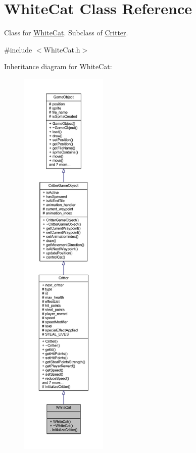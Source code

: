 \hypertarget{class_white_cat}{\section{White\+Cat Class Reference}
\label{class_white_cat}
}


Class for \hyperlink{class_white_cat}{White\+Cat}. Subclass of \hyperlink{class_critter}{Critter}.  




{\ttfamily \#include $<$White\+Cat.\+h$>$}



Inheritance diagram for White\+Cat\+:
\nopagebreak
\begin{figure}[H]
\begin{center}
\leavevmode
\includegraphics[height=550pt]{class_white_cat__inherit__graph}
\end{center}
\end{figure}


